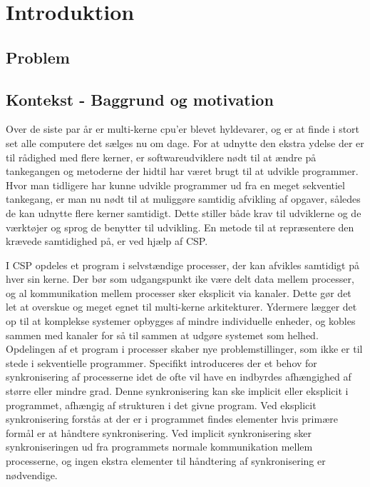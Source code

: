 \chapter{Introduktion}
  \section{Problem}	 
  \section{Kontekst - Baggrund og motivation}
Over de siste par år er multi-kerne cpu'er blevet hyldevarer, og er at finde i 
stort set alle computere det sælges nu om dage. For at udnytte den ekstra 
ydelse der er til rådighed med flere kerner, er softwareudviklere nødt til at 
ændre på tankegangen og metoderne der hidtil har været brugt til at udvikle 
programmer. Hvor man tidligere har kunne udvikle programmer ud fra en meget 
sekventiel tankegang, er man nu nødt til at muliggøre samtidig afvikling af 
opgaver, således de kan udnytte flere kerner samtidigt. Dette stiller både krav 
til udviklerne og de værktøjer og sprog de benytter til udvikling.  En metode 
til at repræsentere den krævede samtidighed på, er ved hjælp af 
CSP\cite{hoare-csp}. 
\begin{shaded}
I CSP opdeles et program i selvstændige processer, der 
kan afvikles samtidigt på hver sin kerne. Der bør som udgangspunkt ike være 
delt data mellem processer, og al kommunikation mellem processer sker eksplicit 
via kanaler. Dette gør det let at overskue og meget egnet til multi-kerne 
arkitekturer. Ydermere lægger det op til at komplekse systemer opbygges af 
mindre individuelle enheder, og kobles sammen med kanaler for så til sammen at 
udgøre systemet som helhed.
Opdelingen af et program i processer skaber nye problemstillinger, som ikke er 
til stede i sekventielle programmer. Specifikt introduceres der et behov for 
synkronisering af processerne idet de ofte vil have en indbyrdes afhængighed af 
større eller mindre grad. Denne synkronisering kan ske implicit eller eksplicit 
i programmet, afhængig af strukturen i det givne program. Ved eksplicit 
synkronisering forstås at der er i programmet findes elementer hvis primære 
formål er at håndtere synkronisering. Ved implicit synkronisering sker 
synkroniseringen ud fra programmets normale kommunikation mellem processerne, 
og ingen ekstra elementer til håndtering af synkronisering er nødvendige.  
\end{shaded}
